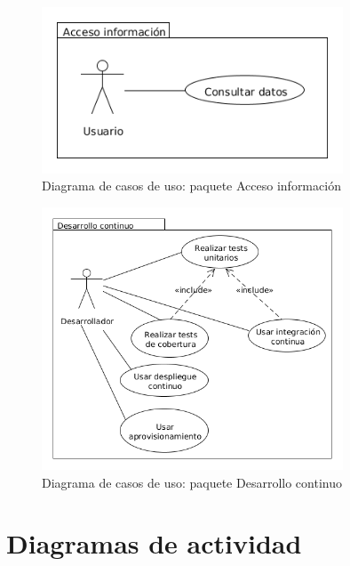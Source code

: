\begin{figure}[!h]
  \begin{center}
  \includegraphics[width=0.8\textwidth]{imagenes/diagrama_casos_uso_acceso_informacion.png}
  \caption[casos_uso_ai]{Diagrama de casos de uso: paquete Acceso información}
  \label{fig:casos_uso_ai}
  \end{center}
\end{figure}

\begin{figure}[!h]
  \begin{center}
  \includegraphics[width=0.8\textwidth]{imagenes/diagrama_casos_uso_desarrollo_continuo.png}
  \caption[casos_uso_dc]{Diagrama de casos de uso: paquete Desarrollo continuo}
  \label{fig:casos_uso_dc}
  \end{center}
\end{figure}

\newpage
\section{Diagramas de actividad}

